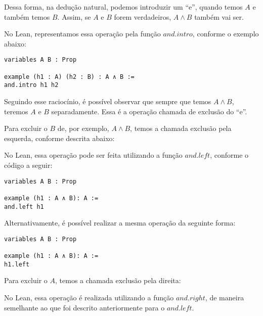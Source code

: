 Dessa forma, na dedução natural, podemos introduzir um ``e'', quando temos $A$ e também temos $B$. Assim, se $A$ e $B$ forem verdadeiros, $A \land B$ também vai ser. 

 \begin{prooftree}
\end{prooftree}

No Lean, representamos essa operação pela função $and.intro$, conforme o exemplo abaixo:

\begin{lstlisting} 
variables A B : Prop

example (h1 : A) (h2 : B) : A ∧ B :=
and.intro h1 h2
\end{lstlisting}

Seguindo esse raciocínio, é possível observar que sempre que temos $A \land B$, teremos $A$ e $B$ separadamente. Essa é a operação chamada de exclusão do ``e''.

Para excluir o $B$ de, por exemplo, $A \land B$, temos a chamada exclusão pela esquerda, conforme descrita abaixo:

 \begin{prooftree}
\end{prooftree}

No Lean, essa operação pode ser feita utilizando a função $and.left$, conforme o código a seguir: 

\begin{lstlisting} 
variables A B : Prop

example (h1 : A ∧ B): A :=
and.left h1
\end{lstlisting}

Alternativamente, é possível realizar a mesma operação da seguinte forma:

\begin{lstlisting} 
variables A B : Prop

example (h1 : A ∧ B): A :=
h1.left
\end{lstlisting}

Para excluir o $A$, temos a chamada exclusão pela direita:

 \begin{prooftree}
\end{prooftree}

No Lean, essa operação é realizada utilizando a função $and.right$, de maneira semelhante ao que foi descrito anteriormente para o $and.left$. 

